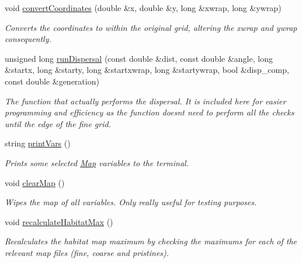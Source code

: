 \begin{DoxyCompactItemize}
void \hyperlink{class_map_af0f4a6a41c91e915614b56b2422d6d5a}{convert\+Coordinates} (double \&x, double \&y, long \&xwrap, long \&ywrap)
\begin{DoxyCompactList}\small\item\em Converts the coordinates to within the original grid, altering the xwrap and ywrap consequently. \end{DoxyCompactList}\item 
unsigned long \hyperlink{class_map_a7c5b0623134a33511d7c17626c967176}{run\+Dispersal} (const double \&dist, const double \&angle, long \&startx, long \&starty, long \&startxwrap, long \&startywrap, bool \&disp\+\_\+comp, const double \&generation)
\begin{DoxyCompactList}\small\item\em The function that actually performs the dispersal. It is included here for easier programming and efficiency as the function doesn\textquotesingle{}t need to perform all the checks until the edge of the fine grid. \end{DoxyCompactList}\item 
string \hyperlink{class_map_af25b0713e794dfa189f0445ffcd511b8}{print\+Vars} ()
\begin{DoxyCompactList}\small\item\em Prints some selected \hyperlink{class_map}{Map} variables to the terminal. \end{DoxyCompactList}\item 
void \hyperlink{class_map_a7ded655c7db0e9d72816430b4f2c83a5}{clear\+Map} ()\hypertarget{class_map_a7ded655c7db0e9d72816430b4f2c83a5}{}\label{class_map_a7ded655c7db0e9d72816430b4f2c83a5}

\begin{DoxyCompactList}\small\item\em Wipes the map of all variables. Only really useful for testing purposes. \end{DoxyCompactList}\item 
void \hyperlink{class_map_a9610a8ee9c5baa8624074fc1ef6ba3e4}{recalculate\+Habitat\+Max} ()\hypertarget{class_map_a9610a8ee9c5baa8624074fc1ef6ba3e4}{}\label{class_map_a9610a8ee9c5baa8624074fc1ef6ba3e4}

\begin{DoxyCompactList}\small\item\em Recalculates the habitat map maximum by checking the maximums for each of the relevant map files (fine, coarse and pristines). \end{DoxyCompactList}\end{DoxyCompactItemize}
